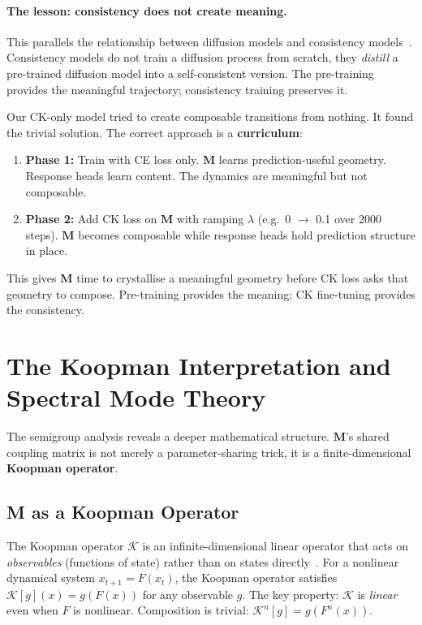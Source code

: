 \documentclass[11pt, a4paper]{article}
\newcommand{\M}{\mathbf{M}}
\theoremstyle{plain}
\theoremstyle{remark}
\begin{document}
\paragraph{The lesson: consistency does not create meaning.}
This parallels the relationship between diffusion models and consistency models~\cite{song2023consistency}.
Consistency models do not train a diffusion process from scratch, they \emph{distill} a pre-trained diffusion model into a self-consistent version.
The pre-training provides the meaningful trajectory; consistency training preserves it.

Our CK-only model tried to create composable transitions from nothing.
It found the trivial solution.
The correct approach is a \textbf{curriculum}:
\begin{enumerate}[nosep]
    \item \textbf{Phase 1:} Train with CE loss only.  $\M$ learns prediction-useful geometry.  Response heads learn content.  The dynamics are meaningful but not composable.
    \item \textbf{Phase 2:} Add CK loss on $\M$ with ramping $\lambda$ (e.g.\ 0 $\to$ 0.1 over 2000 steps).  $\M$ becomes composable while response heads hold prediction structure in place.
\end{enumerate}
This gives $\M$ time to crystallise a meaningful geometry before CK loss asks that geometry to compose.
Pre-training provides the meaning; CK fine-tuning provides the consistency.

\section{The Koopman Interpretation and Spectral Mode Theory}\label{sec:koopman}

The semigroup analysis reveals a deeper mathematical structure.
$\M$'s shared coupling matrix is not merely a parameter-sharing trick, it is a finite-dimensional \textbf{Koopman operator}.

\subsection{M as a Koopman Operator}

The Koopman operator $\mathcal{K}$ is an infinite-dimensional linear operator that acts on \emph{observables} (functions of state) rather than on states directly~\cite{koopman_original}.
For a nonlinear dynamical system $x_{t+1} = F(x_t)$, the Koopman operator satisfies $\mathcal{K}[g](x) = g(F(x))$ for any observable $g$.
The key property: $\mathcal{K}$ is \emph{linear} even when $F$ is nonlinear.
Composition is trivial: $\mathcal{K}^n[g] = g(F^n(x))$.
\end{document}
